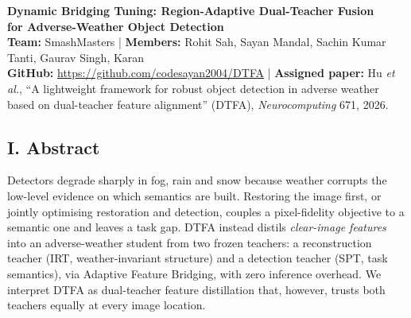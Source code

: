 \documentclass[8pt,a4paper]{article}
\begin{document}
\thispagestyle{empty}

\begin{center}

{\large\bfseries
Dynamic Bridging Tuning: Region-Adaptive Dual-Teacher Fusion\\
for Adverse-Weather Object Detection}\\[4pt]

\textbf{Team:} SmashMasters
\quad | \quad
\textbf{Members:}
Rohit Sah, Sayan Mandal, Sachin Kumar Tanti, Gaurav Singh, Karan\\[3pt]

\textbf{GitHub:}
\url{https://github.com/codesayan2004/DTFA}
\quad | \quad
\textbf{Assigned paper:} Hu \emph{et al.}, ``A lightweight framework for robust object detection in adverse weather based on dual-teacher feature alignment'' (DTFA), \emph{Neurocomputing} 671, 2026.

\end{center}

\vspace{-5pt}

\subsection*{I. Abstract }
Detectors degrade sharply in fog, rain and snow because weather corrupts the low-level evidence on which semantics are built. Restoring the image first, or jointly optimising restoration and detection, couples a pixel-fidelity objective to a semantic one and leaves a task gap. DTFA instead distils \emph{clear-image features} into an adverse-weather student from two frozen teachers: a reconstruction teacher (IRT, weather-invariant structure) and a detection teacher (SPT, task semantics), via Adaptive Feature Bridging, with zero inference overhead. We interpret DTFA as dual-teacher feature distillation that, however, trusts both teachers equally at every image location.

\end{document}
